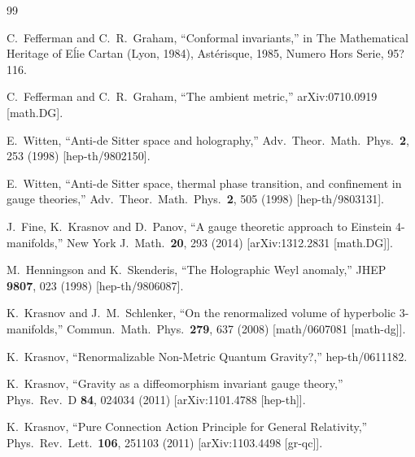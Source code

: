 \documentclass[a4paper,12pt]{article}
\begin{document}
\begin{thebibliography}{99}

 C.~Fefferman and C.~R.~Graham, ``Conformal invariants,'' in The Mathematical Heritage of E\'lie Cartan (Lyon, 1984), Ast\'erisque, 1985, Numero Hors Serie, 95?116.

  C.~Fefferman and C.~R.~Graham,
  ``The ambient metric,''
  arXiv:0710.0919 [math.DG].
  
  E.~Witten,
  ``Anti-de Sitter space and holography,''
  Adv.\ Theor.\ Math.\ Phys.\  {\bf 2}, 253 (1998)
  [hep-th/9802150].
  
  E.~Witten,
  ``Anti-de Sitter space, thermal phase transition, and confinement in gauge theories,''
  Adv.\ Theor.\ Math.\ Phys.\  {\bf 2}, 505 (1998)
  [hep-th/9803131].
  
  J.~Fine, K.~Krasnov and D.~Panov,
  ``A gauge theoretic approach to Einstein 4-manifolds,''
  New York J.\ Math.\  {\bf 20}, 293 (2014)
  [arXiv:1312.2831 [math.DG]].
  
  M.~Henningson and K.~Skenderis,
  ``The Holographic Weyl anomaly,''
  JHEP {\bf 9807}, 023 (1998)
  [hep-th/9806087].
  
  K.~Krasnov and J.~M.~Schlenker,
  ``On the renormalized volume of hyperbolic 3-manifolds,''
  Commun.\ Math.\ Phys.\  {\bf 279}, 637 (2008)
  [math/0607081 [math-dg]].
  
  K.~Krasnov,
  ``Renormalizable Non-Metric Quantum Gravity?,''
  hep-th/0611182.
  
  K.~Krasnov,
  ``Gravity as a diffeomorphism invariant gauge theory,''
  Phys.\ Rev.\ D {\bf 84}, 024034 (2011)
  [arXiv:1101.4788 [hep-th]].
  
  K.~Krasnov,
  ``Pure Connection Action Principle for General Relativity,''
  Phys.\ Rev.\ Lett.\  {\bf 106}, 251103 (2011)
  [arXiv:1103.4498 [gr-qc]].
  

\end{thebibliography}
\end{document}
